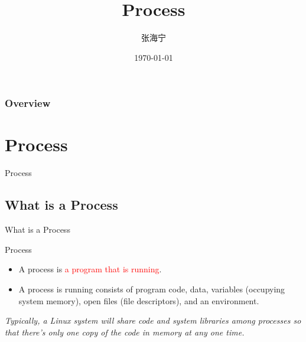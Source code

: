 \documentclass{beamer}
\title[Process]{Process} %
\author{张海宁} %
\institute[计算机科学与技术学院] %
{
贵州大学 \\ %
\medskip
\textit{hnzhang1@gzu.edu.cn} %
}
\date{\today} %
\begin{document}
\begin{frame}
\titlepage %
\end{frame}

\begin{frame}
\frametitle{Overview} %
\tableofcontents %
\end{frame}

\section{Process}
\begin{frame}
\Huge{\centerline{Process}}
\end{frame}
\subsection{What is a Process}
\begin{frame}
\Huge{\centerline{What is a Process}}
\end{frame}
\begin{frame}{Process}
\begin{itemize}
\item
A process is \textcolor{red}{a program that is running}.
\item
A process is running consists of program code, data, variables (occupying system memory), open files (file descriptors), and an environment.
\end{itemize}
\emph{Typically, a Linux system will share code and system libraries among processes so that there’s only one copy of the code in memory at any one time.}
\end{frame}
\end{document}
